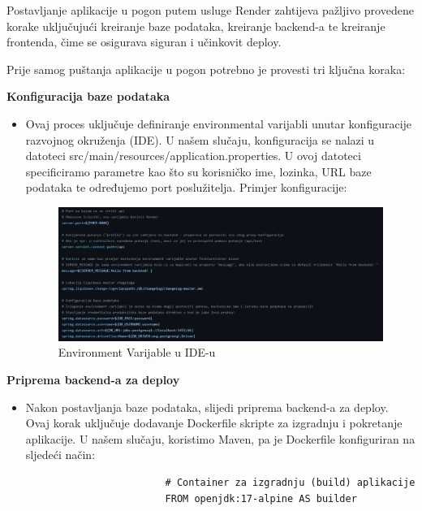 			
			Postavljanje aplikacije u pogon putem usluge Render zahtijeva pažljivo provedene korake uključujući kreiranje baze podataka, kreiranje backend-a  te kreiranje frontenda, čime se osigurava siguran i učinkovit deploy.
			
			Prije samog puštanja aplikacije u pogon potrebno je provesti tri ključna koraka:
			\begin{packed_enum}
				\item \textbf{Konfiguracija baze podataka}
				\begin{itemize}
					\item Ovaj proces uključuje definiranje environmental varijabli unutar konfiguracije razvojnog okruženja (IDE). U našem slučaju, konfiguracija se nalazi u datoteci src/main/resources/application.properties. U ovoj datoteci specificiramo parametre kao što su korisničko ime, lozinka, URL baze podataka te određujemo port poslužitelja. Primjer konfiguracije:
					\begin{figure}[H]
						\includegraphics[scale=0.5]{slike/EnvironmentVarijable}
						\centering
						\caption{Environment Varijable u IDE-u}
						\label{fig:EnvVar}
					\end{figure}
					
						
				\end{itemize}
				\item \textbf{Priprema backend-a za deploy}
				\begin{itemize}
					\item Nakon postavljanja baze podataka, slijedi priprema backend-a za deploy. Ovaj korak uključuje dodavanje Dockerfile skripte za izgradnju i pokretanje aplikacije.  U našem slučaju, koristimo Maven, pa je Dockerfile konfiguriran na sljedeći način:
					\begin{lstlisting}
						# Container za izgradnju (build) aplikacije
						FROM openjdk:17-alpine AS builder
						

\end{lstlisting}
\end{itemize}
\end{packed_enum}
